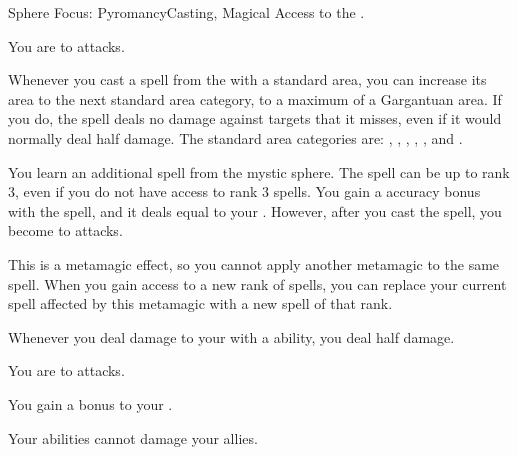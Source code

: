   \begin{magicalfeat}{Sphere Focus: Pyromancy}{Casting, Magical}
    \featpre Access to the  .

     You are \impervious to \atFire attacks.

     Whenever you cast a spell from the   with a standard area, you can increase its area to the next standard area category, to a maximum of a Gargantuan area.
    If you do, the spell deals no damage against targets that it misses, even if it would normally deal half damage.
    The standard area categories are: \tinyarea, \smallarea, \medarea, \largearea, \hugearea, and \gargarea.

     You learn an additional spell from the  mystic sphere.
    The spell can be up to rank 3, even if you do not have access to rank 3 spells.
    You gain a  accuracy bonus with the spell, and it deals  equal to your .
    However, after you cast the spell, you become  \vulnerable to \atCold attacks.

    This is a metamagic effect, so you cannot apply another metamagic to the same spell.
    When you gain access to a new rank of spells, you can replace your current spell affected by this metamagic with a new spell of that rank.

     Whenever you deal damage to your  with a \atFire ability, you deal half damage.

     You are  to \atFire attacks.

     You gain a  bonus to your .

     Your \atFire abilities cannot damage your allies.
  \end{magicalfeat}


